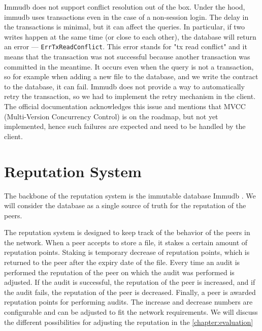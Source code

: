 Immudb does not support conflict resolution out of the box.
Under the hood, immudb uses transactions even in the case of a non-session login.
The delay in the transactions is minimal, but it can affect the queries.
In particular, if two writes happen at the same time (or close to each other),
the database will return an error --- \texttt{ErrTxReadConflict}.
This error stands for "tx read conflict" and it means that the transaction was not successful
because another transaction was committed in the meantime.
It occurs even when the query is not a transaction,
so for example when adding a new file to the database, and we write the contract to the database, it can fail.
Immudb does not provide a way to automatically retry the transaction,
so we had to implement the retry mechanism in the client.
The official documentation acknowledges this issue and mentions that MVCC (Multi-Version Concurrency Control)
is on the roadmap, but not yet implemented, hence such failures are expected and need to be handled by the client.

\section{Reputation System}
\label{section:reputation-system}

The backbone of the reputation system is the immutable database Immudb \cite{immudb}.
We will consider the database as a single source of truth for the reputation of the peers.

The reputation system is designed to keep track of the behavior of the peers in the network.
When a peer accepts to store a file, it stakes a certain amount of reputation points.
Staking is temporary decrease of reputation points,
which is returned to the peer after the expiry date of the file.
Every time an audit is performed the reputation of the peer on which the audit was performed is adjusted.
If the audit is successful, the reputation of the peer is increased,
and if the audit fails, the reputation of the peer is decreased.
Finally, a peer is awarded reputation points for performing audits.
The increase and decrease numbers are configurable and can be adjusted to fit the network requirements.
We will discuss the different possibilities for adjusting the reputation in the \autoref{chapter:evaluation}

